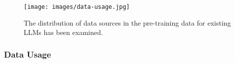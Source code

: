 \documentclass[conference]{IEEEtran}
\begin{document}
\begin{figure}
  \texttt{[image: images/data-usage.jpg]}
  \caption{The distribution of data sources in the pre-training data for existing LLMs has been examined. \cite{zhao2023survey}}
  \label{fig:data_distributed}
\end{figure}

\subsubsection{Data Usage}




\end{document}
